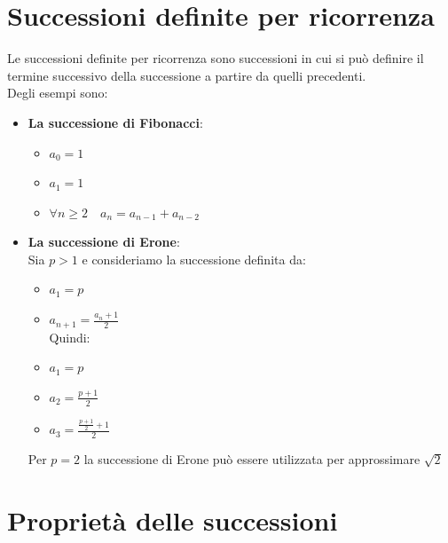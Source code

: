 \documentclass[12pt]{report}
\begin{document}
	\section{Successioni definite per ricorrenza}
	Le successioni definite per ricorrenza sono successioni in cui si può definire il termine successivo della successione a partire da quelli precedenti. \\
	Degli esempi sono:
	\begin{itemize}
		\item \textbf{La successione di Fibonacci}:
		\begin{itemize}
			\item $a_0 = 1$
			\item $a_1 = 1$
			\item $\forall n \geq 2 \quad a_n = a_{n - 1} + a_{n - 2}$
		\end{itemize}
		\item \textbf{La successione di Erone}: \\
		Sia $p > 1$ e consideriamo la successione  definita da:
		\begin{itemize}
			\item $a_1 = p$
			\item $a_{n + 1} = \frac{a_n + 1}{2}$ \\
			Quindi:
			\item $a_1 = p$
			\item $a_2 = \frac{p + 1}{2}$
			\item $a_3 = \frac{\frac{p + 1}{2} + 1}{2}$
		\end{itemize}
		Per $p = 2$ la successione di Erone può essere utilizzata per approssimare $\sqrt{2}$
	\end{itemize}
	\section{Proprietà delle successioni}
\end{document}
